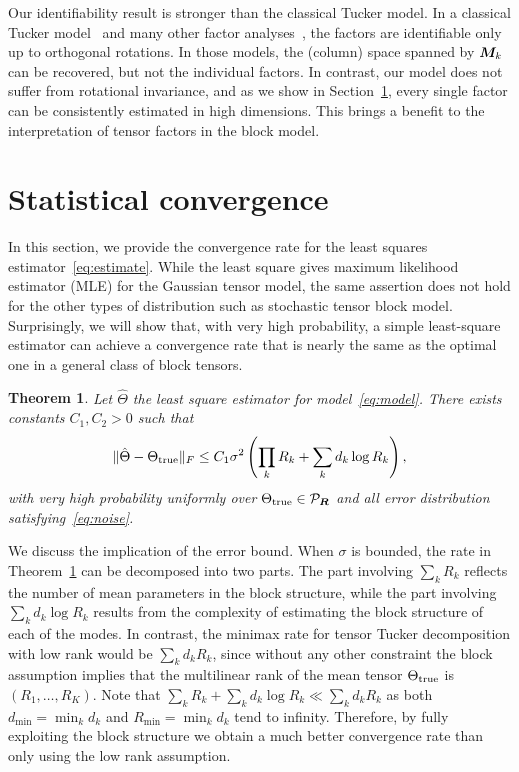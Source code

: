 \documentclass{article}
\newtheorem{theorem}{Theorem}
\begin{document}
Our identifiability result is stronger than the classical Tucker model. In a classical Tucker model~\cite{zhang2018tensor,kolda2009tensor} and many other factor analyses~\cite{darton1980rotation,abdi2003factor}, the factors are identifiable only up to orthogonal rotations. In those models, the (column) space spanned by $\bm M_k$ can be recovered, but not the individual factors. In contrast, our model does not suffer from rotational invariance, and as we show in Section~\ref{sec:theory}, every single factor can be consistently estimated in high dimensions. This brings a benefit to the interpretation of tensor factors in the block model.  



\section{Statistical convergence}\label{sec:theory}
In this section, we provide the convergence rate for the least squares estimator~\eqref{eq:estimate}. While the least square gives maximum likelihood estimator (MLE) for the Gaussian tensor model, the same assertion does not hold for the other types of distribution such as stochastic tensor block model. Surprisingly, we will show that, with very high probability, a simple least-square estimator can achieve a convergence rate that is nearly the same as the optimal one in a general class of block tensors. 

\begin{theorem} \label{thm:main}
Let $\hat \Theta$ the least square estimator for model~\eqref{eq:model}. There exists constants $C_1, C_2>0$ such that 
\[
\lVert\hat \Theta-\Theta_{\text{true}}\rVert_F\leq C_1 \sigma^2 \left( \prod_k R_k+\sum_k d_k \log R_k\right),
\]
with very high probability uniformly over $\Theta_{\text{true}}\in\mathcal{P}_{\bm{R}}$ and all error distribution satisfying~\eqref{eq:noise}. 
\end{theorem}

We discuss the implication of the error bound. When $\sigma$ is bounded, the rate in Theorem~\ref{thm:main} can be decomposed into two parts. The part involving $\sum_k R_k$ reflects the number of mean parameters in the block structure, while the part involving $\sum_k d_k \log R_k$ results from the complexity of estimating the block structure of each of the modes. In contrast, the minimax rate for tensor Tucker decomposition with low rank would be $\sum_kd_kR_k$, since without any other constraint the block assumption implies that the multilinear rank of the mean tensor $\Theta_{\text{true}}$ is $(R_1,\ldots,R_K)$. Note that $\sum_k R_k+ \sum_k d_k \log R_k\ll \sum_k d_k R_k$ as both $d_{\min}=\min_kd_k$ and $R_{\min}=\min_k d_k$ tend to infinity. Therefore, by fully exploiting the block structure we obtain a much better convergence rate than only using the low rank assumption. 
\end{document}
